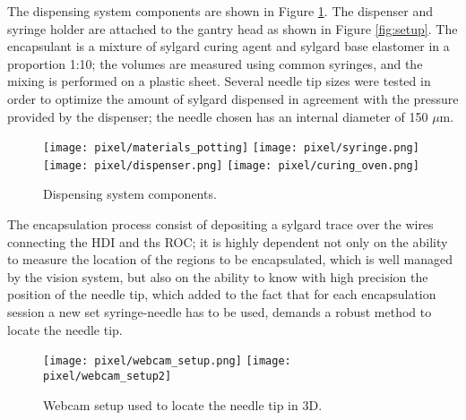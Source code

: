 The dispensing system components are shown in Figure \ref{fig:potting_comp}. The dispenser and syringe holder are attached to the gantry head as shown in Figure \ref{fig:setup}. The encapsulant is a mixture of sylgard curing agent and sylgard base elastomer in a proportion 1:10; the volumes are measured using common syringes, and the mixing is performed on a plastic sheet. Several needle tip sizes were tested in order to optimize the amount of sylgard dispensed in agreement with the pressure provided by the dispenser; the needle chosen has an internal diameter of 150 $\mu$m.

\begin{figure}[h]
  \begin{center}
    \texttt{[image: pixel/materials\_potting]}
    \texttt{[image: pixel/syringe.png]}\\
    \texttt{[image: pixel/dispenser.png]}
    \texttt{[image: pixel/curing\_oven.png]}
    \caption[Dispensing system components.]{Dispensing system components.}\label{fig:potting_comp}
  \end{center}
\end{figure}

The encapsulation process consist of depositing a sylgard trace over the wires connecting the HDI and ths ROC; it is highly dependent not only on the ability to measure the location of the regions to be encapsulated, which is well managed by the vision system, but also on the ability to know with high precision the position of the needle tip, which added to the fact that for each encapsulation session a new set syringe-needle has to be used, demands a robust method to locate the needle tip.

\begin{figure}[h]
  \begin{center}
    \texttt{[image: pixel/webcam\_setup.png]}
    \texttt{[image: pixel/webcam\_setup2]}
    \caption[Webcam setup.]{Webcam setup used to locate the needle tip in 3D.}\label{fig:webcam_setup}
  \end{center}
\end{figure}

